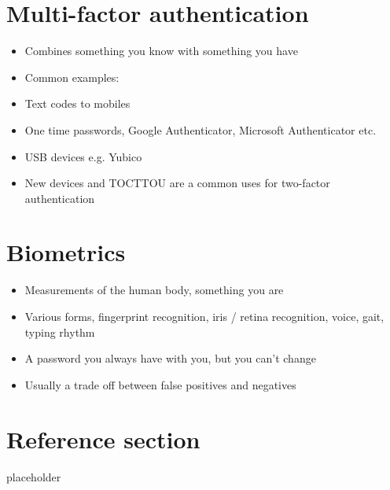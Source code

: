\documentclass{article}
\begin{document}
\section{Multi-factor authentication}  
\begin{itemize}
  \item Combines something you know with something you have 
  \item Common examples: 
  \item Text codes to mobiles 
  \item One time passwords, Google Authenticator, Microsoft Authenticator etc. 
  \item USB devices e.g. Yubico 
  \item New devices and TOCTTOU are a common uses for two-factor authentication
\end{itemize}

\section{Biometrics}
\begin{itemize}
  \item Measurements of the human body, something you are 
  \item Various forms, fingerprint recognition, iris / retina recognition, voice, gait, typing rhythm 
  \item A password you always have with you, but you can’t change 
  \item Usually a trade off between false positives and negatives
\end{itemize}

\pagebreak
\section*{Reference section} \label{sec:reference}
\begin{description}
	\item[placeholder] \hfill \\
\end{description}
\end{document}
